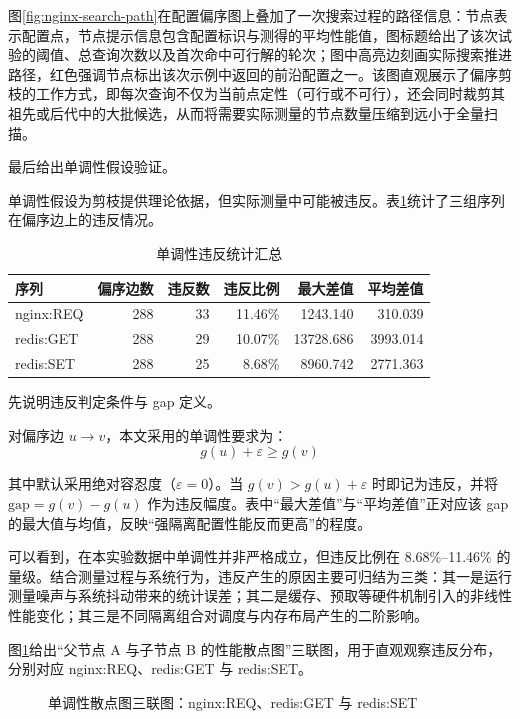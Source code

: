 \documentclass[UTF8,a4paper,12pt,twoside]{ctexart}  %
\begin{document}
图\ref{fig:nginx-search-path}在配置偏序图上叠加了一次搜索过程的路径信息：节点表示配置点，节点提示信息包含配置标识与测得的平均性能值，图标题给出了该次试验的阈值、总查询次数以及首次命中可行解的轮次；图中高亮边刻画实际搜索推进路径，红色强调节点标出该次示例中返回的前沿配置之一。该图直观展示了偏序剪枝的工作方式，即每次查询不仅为当前点定性（可行或不可行），还会同时裁剪其祖先或后代中的大批候选，从而将需要实际测量的节点数量压缩到远小于全量扫描。

最后给出单调性假设验证。

单调性假设为剪枝提供理论依据，但实际测量中可能被违反。表\ref{tab:monotonic-violation-summary}统计了三组序列在偏序边上的违反情况。

{\small
\setlength{\tabcolsep}{4pt}
\begin{longtable}{@{}lrrrrr@{}}
\caption{单调性违反统计汇总}\label{tab:monotonic-violation-summary}\\
\toprule
序列 & 偏序边数 & 违反数 & 违反比例 & 最大差值 & 平均差值 \\
\midrule
\endhead
\bottomrule
\endlastfoot
nginx:REQ & 288 & 33 & 11.46\% & 1243.140 & 310.039 \\
redis:GET & 288 & 29 & 10.07\% & 13728.686 & 3993.014 \\
redis:SET & 288 & 25 & 8.68\% & 8960.742 & 2771.363 \\
\end{longtable}
}

先说明违反判定条件与 gap 定义。

对偏序边 \(u\to v\)，本文采用的单调性要求为：
\begin{equation}
g(u) + \varepsilon \ge g(v)
\end{equation}

其中默认采用绝对容忍度（\(\varepsilon=0\)）。当
\(g(v) > g(u)+\varepsilon\) 时即记为违反，并将 \(\text{gap}=g(v)-g(u)\)
作为违反幅度。表中``最大差值''与``平均差值''正对应该 gap
的最大值与均值，反映``强隔离配置性能反而更高''的程度。

可以看到，在本实验数据中单调性并非严格成立，但违反比例在 8.68\%--11.46\%
的量级。结合测量过程与系统行为，违反产生的原因主要可归结为三类：其一是运行测量噪声与系统抖动带来的统计误差；其二是缓存、预取等硬件机制引入的非线性性能变化；其三是不同隔离组合对调度与内存布局产生的二阶影响。

图\ref{fig:hypothesis-a2b-panel}给出``父节点 A 与子节点 B 的性能散点图''三联图，用于直观观察违反分布，分别对应 nginx:REQ、redis:GET 与 redis:SET。

\begin{figure}[h]
  \centering
  
  \caption{单调性散点图三联图：nginx:REQ、redis:GET 与 redis:SET}
  \label{fig:hypothesis-a2b-panel}
\end{figure}
\end{document}
